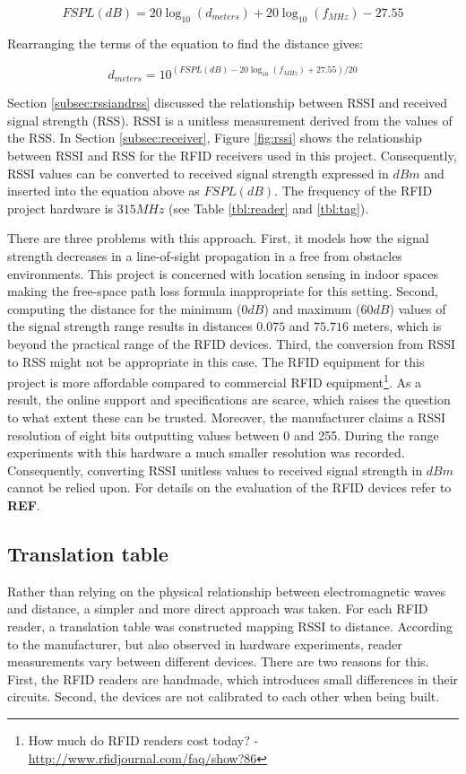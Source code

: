 \[ FSPL(dB) = 20\log_{10}(d_{meters}) + 20\log_{10}(f_{MHz}) - 27.55 \]
	
Rearranging the terms of the equation to find the distance gives:

\[ d_{meters} = 10^{(FSPL(dB) - 20\log_{10}(f_{MHz}) + 27.55) / 20} \]

Section \ref{subsec:rssiandrss} discussed the relationship between RSSI and received signal strength (RSS). RSSI is a unitless measurement derived from the values of the RSS. In Section \ref{subsec:receiver}, Figure \ref{fig:rssi} shows the relationship between RSSI and RSS for the RFID receivers used in this project. Consequently, RSSI values can be converted to received signal strength expressed in $dBm$ and inserted into the equation above as $FSPL(dB)$. The frequency of the RFID project hardware is  $315MHz$ (see Table \ref{tbl:reader} and \ref{tbl:tag}).

There are three problems with this approach. First, it models how the signal strength decreases in a line-of-sight propagation in a free from obstacles environments. This project is concerned with location sensing in indoor spaces making the free-space path loss formula inappropriate for this setting. Second, computing the distance for the minimum ($0dB$) and maximum ($60dB$) values of the signal strength range results in distances $0.075$ and $75.716$ meters, which is beyond the practical range of the RFID devices. Third, the conversion from RSSI to RSS might not be appropriate in this case. The RFID equipment for this project is more affordable compared to commercial RFID equipment\footnote{How much do RFID readers cost today? - \url{http://www.rfidjournal.com/faq/show?86}}. As a result, the online support and specifications are scarce, which raises the question to what extent these can be trusted. Moreover, the manufacturer claims a RSSI resolution of eight bits outputting values between 0 and 255. During the range experiments with this hardware a much smaller resolution was recorded. Consequently, converting RSSI unitless values to received signal strength in $dBm$ cannot be relied upon. For details on the evaluation of the RFID devices refer to \textbf{REF}. 

\subsection{Translation table}

Rather than relying on the physical relationship between electromagnetic waves and distance, a simpler and more direct approach was taken. For each RFID reader, a translation table was constructed mapping RSSI to distance. According to the manufacturer, but also observed in hardware experiments, reader measurements vary between different devices. There are two reasons for this. First, the RFID readers are handmade, which introduces small differences in their circuits. Second, the devices are not calibrated to each other when being built.   

